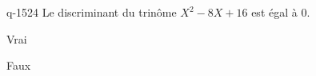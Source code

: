 \begin{truefalse}{q-1524}
Le discriminant du trinôme $X^2-8X+16$ est égal à $0$.
\item* Vrai
\item Faux
\end{truefalse}

